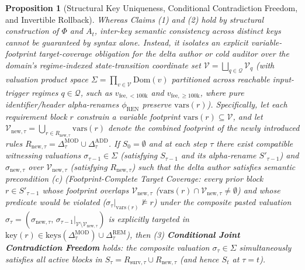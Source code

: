 \documentclass[11pt,a4paper,copyright]{google}
\newtheorem{proposition}{Proposition}
\begin{document}
\begin{proposition}[Structural Key Uniqueness, Conditional Contradiction Freedom, and Invertible Rollback]
Whereas Claims (1) and (2) hold by structural construction of $\Phi$ and $A_t$, inter-key semantic consistency across distinct keys cannot be guaranteed by syntax alone. Instead, it isolates an explicit variable-footprint target-coverage obligation for the delta author or cold auditor over the domain's regime-indexed state-transition coordinate set $\mathcal{V} = \bigsqcup_{q \in \mathcal{Q}} \mathcal{V}_q$ (with valuation product space $\Sigma = \prod_{v \in \mathcal{V}} \text{Dom}(v)$ partitioned across reachable input-trigger regimes $q \in \mathcal{Q}$, such as $v_{\text{fee}, <100\text{k}}$ and $v_{\text{fee}, \ge 100\text{k}}$, where pure identifier/header alpha-renames $\phi_{\text{REN}}$ preserve $\text{vars}(r)$). Specifically, let each requirement block $r$ constrain a variable footprint $\text{vars}(r) \subseteq \mathcal{V}$, and let $\mathcal{V}_{\text{new},\tau} = \bigcup_{r \in R_{\text{new},\tau}} \text{vars}(r)$ denote the combined footprint of the newly introduced rules $R_{\text{new},\tau} = \Delta_\tau^{\text{MOD}} \cup \Delta_\tau^{\text{ADD}}$. If $S_0 = \emptyset$ and at each step $\tau$ there exist compatible witnessing valuations $\sigma_{\tau-1} \in \Sigma$ (satisfying $S_{\tau-1}$ and its alpha-rename $S'_{\tau-1}$) and $\sigma_{\text{new},\tau}$ over $\mathcal{V}_{\text{new},\tau}$ (satisfying $R_{\text{new},\tau}$) such that the delta author satisfies semantic precondition (c) (\emph{Footprint-Complete Target Coverage}: every prior block $r \in S'_{\tau-1}$ whose footprint overlaps $\mathcal{V}_{\text{new},\tau}$ ($\text{vars}(r) \cap \mathcal{V}_{\text{new},\tau} \neq \emptyset$) and whose predicate would be violated ($\sigma_\tau|_{\text{vars}(r)} \not\models r$) under the composite pasted valuation $\sigma_\tau = (\sigma_{\text{new},\tau},\, \sigma_{\tau-1}|_{\mathcal{V} \setminus \mathcal{V}_{\text{new},\tau}})$ is explicitly targeted in $\text{key}(r) \in \text{keys}(\Delta_\tau^{\text{MOD}}) \cup \Delta_\tau^{\text{REM}}$), then (3) \textbf{Conditional Joint Contradiction Freedom} holds: the composite valuation $\sigma_\tau \in \Sigma$ simultaneously satisfies all active blocks in $S_\tau = R_{\text{surv},\tau} \cup R_{\text{new},\tau}$ (and hence $S_t$ at $\tau = t$).
\end{proposition}
\end{document}
